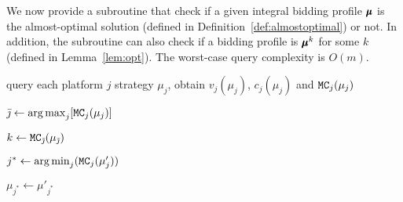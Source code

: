We now provide a subroutine that check if a given integral bidding profile $\pmb{\mu}$ is the almost-optimal solution (defined in Definition~\ref{def:almostoptimal}) or not.
In addition, the subroutine can also check if a bidding profile is $\pmb{\mu}^k$ for some $k$ (defined in Lemma~\ref{lem:opt}). The worst-case query complexity is $O(m)$.

\begin{algorithm}[ht]
\DontPrintSemicolon
\LinesNumbered
\SetNoFillComment
{}
query each platform $j$ strategy $\mu_j$, obtain $v_j(\mu_j)$, $c_j(\mu_j)$ and $\texttt{MC}_j(\mu_j)$

$\bar{\jmath} \gets \operatorname*{arg\,max}_{j}[\texttt{MC}_j(\mu_j)]$

$k \gets \texttt{MC}_{\bar{\jmath} }(\mu_{\bar{\jmath}})$

    $j^* \gets \operatorname*{arg\,min}_{j}(\texttt{MC}_j(\mu'_j))$ 
    
    $\mu_{j^*} \gets \mu'_{j^*}$
    

\caption{\optcheck}
\label{sub:optcheck}
\end{algorithm}
\renewcommand*{\algorithmcfname}{ALGORITHM}

